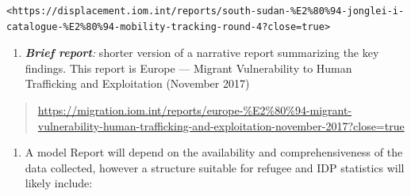 \documentclass[
]{article}
\providecommand{\tightlist}{%
  \setlength{\itemsep}{0pt}\setlength{\parskip}{0pt}}
\begin{document}
\begin{verbatim}
<https://displacement.iom.int/reports/south-sudan-%E2%80%94-jonglei-i-catalogue-%E2%80%94-mobility-tracking-round-4?close=true>
\end{verbatim}

\begin{enumerate}
\def\labelenumi{\roman{enumi}.}
\setcounter{enumi}{3}
\tightlist
\item
  \emph{\textbf{Brief report}:} shorter version of a narrative report
  summarizing the key findings. This report is {Europe --- Migrant
  Vulnerability to Human Trafficking and Exploitation
  (November 2017)}
\end{enumerate}

\begin{quote}
\url{https://migration.iom.int/reports/europe-\%E2\%80\%94-migrant-vulnerability-human-trafficking-and-exploitation-november-2017?close=true}
\end{quote}

\begin{enumerate}
\def\labelenumi{\arabic{enumi}.}
\setcounter{enumi}{514}
\tightlist
\item
  A model Report will depend on the availability and
  comprehensiveness of the data collected, however a structure
  suitable for refugee and IDP statistics will likely include:
\end{enumerate}
\end{document}
